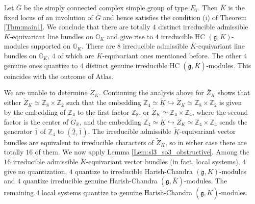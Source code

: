\documentclass[12pt]{amsart}
\newcommand{\g}{\mathfrak{g}}
\newcommand{\Orb}{\mathbb{O}}
\newcommand{\Z}{\mathbb{Z}}
\newcommand{\kf}{\mathfrak{k}}
\newcommand{\R}{\mathbb{R}}
\theoremstyle{definition}
\numberwithin{equation}{section}
\begin{document}
Let $\bar{G}$ be the simply connected complex simple group of type $E_7$. Then $\bar{K}$ is the fixed locus of an involution of $\bar{G}$ and hence satisfies the condition (i) of Theorem \ref{Thm:main1}. We conclude that there are totally $4$ distinct irreducible admissible $K$-equivariant line bundles on $\Orb_K$ and give rise to $4$ irreducible HC $(\g,K)$-modules supported on $\Orb_K$. There are $8$ irreducible admissible $\bar{K}$-equivariant line bundles on  $\Orb_K$, $4$ of which are $K$-equivariant ones mentioned before. The other $4$ genuine ones quantize to $4$ distinct genuine irreducible HC $(\g, \bar{K})$-modules. This coincides with the outcome of Atlas.


We are unable to determine $\tilde{Z}_K$. Continuing the analysis above for $\bar{Z}_K$ shows that either $\tilde{Z}_K \simeq \Z_8 \times \Z_2$ such that the embedding $\Z_4 \simeq \underline{\tilde{K}} \hookrightarrow \tilde{Z}_K \simeq \Z_8 \times \Z_2$ is given by the embedding of $\Z_4$ to the first factor $\Z_8$, or $\tilde{Z}_K \simeq \Z_4 \times \Z_4$, where the second factor is the center of $\tilde{G}_\R$, and the embedding $\Z_4 \simeq \underline{\tilde{K}} \hookrightarrow \tilde{Z}_K \simeq \Z_4 \times \Z_4$ sends the generator $\bar{1}$ of $\Z_4$ to $(\bar{2}, \bar{1})$. The irreducible admissible $\tilde{K}$-equivariant vector bundles are equivalent to irreducible characters of $\tilde{Z}_K$, so in either case there are totally $16$ of them. We now apply Lemma \ref{Lem:sl3_so3_obstructive}. Among the $16$ irreducible admissible $\tilde{K}$-equivariant vector bundles (in fact, local systems), $4$ give no quantization, $4$ quantize to irreducible Harish-Chandra $(\g, K)$-modules and $4$ quantize irreducible genuine Harish-Chandra $(\g, \bar{K})$-modules. The remaining $4$ local systems quantize to genuine Harish-Chandra $(\g, \tilde{K})$-modules.\\
\end{document}
